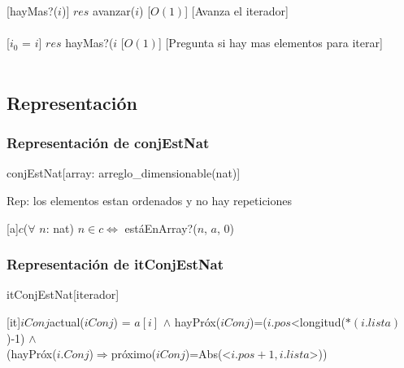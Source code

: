   [hayMas?($i$)]
  {$res$ \igobs avanzar($i$)}
  [$O(1)$]
  [Avanza el iterador]\\\\
  
  [$i_{0}$ = $i$]
  {$res$ \igobs hayMas?($i$}
  [$O(1)$]
  [Pregunta si hay mas elementos para iterar]\\\\
\subsection{Representaci\'on}
\subsubsection{Representaci\'on de conjEstNat}
\begin{Estructura}{conjEstNat}[array: arreglo\_dimensionable(nat)]\end{Estructura}
 	Rep: los elementos estan ordenados y no hay repeticiones
 	
 	[a]{$c$}{($\forall$ $n$: nat) $n \in c \Leftrightarrow$ est\'aEnArray?($n$, $a$, 0)}
 	
 	
\subsubsection{Representaci\'on de itConjEstNat}
\begin{Estructura}{itConjEstNat}[iterador]
	\begin{Tupla}[iterador]
	\end{Tupla}
\end{Estructura}

	
	[it]{$iConj$}{actual($iConj$) = $a[i]$ $\land$ hayPr\'ox($iConj$)=($i.pos$<longitud($*(i.lista)$)-1) $\land$ \\(hayPr\'ox($i.Conj$)$\Rightarrow$pr\'oximo($iConj$)=Abs(<$i.pos+1, i.lista$>))}
	
